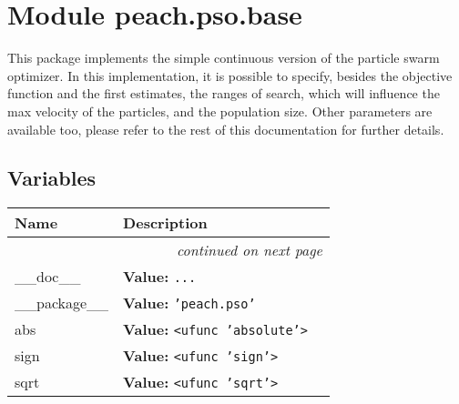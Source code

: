 %
%
%


\section{Module peach.pso.base}

    \label{peach:pso:base}

This package implements the simple continuous version of the particle swarm
optimizer. In this implementation, it is possible to specify, besides the
objective function and the first estimates, the ranges of search, which will
influence the max velocity of the particles, and the population size. Other
parameters are available too, please refer to the rest of this documentation for
further details.


  \subsection{Variables}

    \vspace{-1cm}
\hspace{\varindent}\begin{longtable}{|p{\varnamewidth}|p{\vardescrwidth}|l}
\cline{1-2}
\cline{1-2} \centering \textbf{Name} & \centering \textbf{Description}& \\
\cline{1-2}
\endhead\cline{1-2}\multicolumn{3}{r}{\small\textit{continued on next page}}\\\endfoot\cline{1-2}
\endlastfoot\raggedright \_\-\_\-d\-o\-c\-\_\-\_\- & \raggedright \textbf{Value:} 
{\tt \texttt{...}}&\\
\cline{1-2}
\raggedright \_\-\_\-p\-a\-c\-k\-a\-g\-e\-\_\-\_\- & \raggedright \textbf{Value:} 
{\tt \texttt{'}\texttt{peach.pso}\texttt{'}}&\\
\cline{1-2}
\raggedright a\-b\-s\- & \raggedright \textbf{Value:} 
{\tt {\textless}ufunc 'absolute'{\textgreater}}&\\
\cline{1-2}
\raggedright s\-i\-g\-n\- & \raggedright \textbf{Value:} 
{\tt {\textless}ufunc 'sign'{\textgreater}}&\\
\cline{1-2}
\raggedright s\-q\-r\-t\- & \raggedright \textbf{Value:} 
{\tt {\textless}ufunc 'sqrt'{\textgreater}}&\\
\cline{1-2}
\end{longtable}


